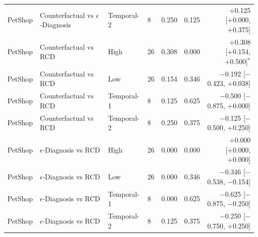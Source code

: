 {\begin{longtable}{llllrrr}
PetShop & Counterfactual vs $\epsilon$-Diagnosis & Temporal-2 & 8 & 0.250 & 0.125 & +0.125 [+0.000, +0.375] \\
PetShop & Counterfactual vs RCD & High & 26 & 0.308 & 0.000 & +0.308 [+0.154, +0.500]$^\ast$ \\
PetShop & Counterfactual vs RCD & Low & 26 & 0.154 & 0.346 & $-$0.192 [$-$0.423, +0.038] \\
PetShop & Counterfactual vs RCD & Temporal-1 & 8 & 0.125 & 0.625 & $-$0.500 [$-$0.875, +0.000] \\
PetShop & Counterfactual vs RCD & Temporal-2 & 8 & 0.250 & 0.375 & $-$0.125 [$-$0.500, +0.250] \\
PetShop & $\epsilon$-Diagnosis vs RCD & High & 26 & 0.000 & 0.000 & +0.000 [+0.000, +0.000] \\
PetShop & $\epsilon$-Diagnosis vs RCD & Low & 26 & 0.000 & 0.346 & $-$0.346 [$-$0.538, $-$0.154] \\
PetShop & $\epsilon$-Diagnosis vs RCD & Temporal-1 & 8 & 0.000 & 0.625 & $-$0.625 [$-$0.875, $-$0.250] \\
PetShop & $\epsilon$-Diagnosis vs RCD & Temporal-2 & 8 & 0.125 & 0.375 & $-$0.250 [$-$0.750, +0.250] \\
\end{longtable}
}
